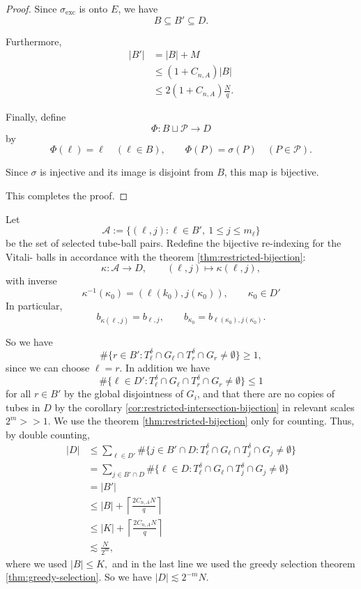 \documentclass[11pt, letterpaper]{nyjm}
\begin{document}
\begin{proof}
		Since $\sigma_{\mathrm{exc}}$ is onto $E$,
		we have
		\[
		B\subseteq B'\subseteq D.
		\]
		
		Furthermore,
		\[
		\begin{aligned}
			|B'|
			&=|B|+M\\
			&\le(1+C_{n,A})|B|\\
			&\le2(1+C_{n,A})\frac Nq.
		\end{aligned}
		\]
		
		Finally, define
		\[
		\Phi:B\sqcup\mathcal P\longrightarrow D
		\]
		by
		\[
		\Phi(\ell)=\ell\quad(\ell\in B),
		\qquad
		\Phi(P)=\sigma(P)\quad(P\in\mathcal P).
		\]
		
		Since $\sigma$ is injective and its
		image is disjoint from $B$, this
		map is bijective.
		
		This completes the proof.
	\end{proof}
	
	Let
	\[
	\mathcal A
	:=
	\{(\ell,j):\ell\in B',\ 1\le j\le m_\ell\}
	\]
	be the set of selected tube-ball pairs.
	Redefine the bijective re-indexing for the Vitali- balls in accordance with the theorem \ref{thm:restricted-bijection}:
	\[
	\kappa:\mathcal A\longrightarrow D,
	\qquad
	(\ell,j)\longmapsto \kappa(\ell,j),
	\]
	with inverse
	\[
	\kappa^{-1}(\kappa_0)
	=
	(\ell(k_0),j(\kappa_0)),
	\qquad \kappa_0 \in D'
	\]
	In particular,
	\[
	b_{\kappa(\ell,j)}=b_{\ell,j},
	\qquad
	b_{\kappa_0}=b_{\ell(\kappa_0),j(\kappa_0)}.
	\]
	
	So we have
	\[
	\#\{r\in B' :T_{\ell}^{\delta} \cap  G_{\ell} \cap T_r^{\delta} \cap G_{r} \neq \emptyset\} \geq 1, 
	\]
	since we can choose $\ell = r.$
	In addition we have 
	\[
	\#\{\ell \in D':T_{\ell}^{\delta} \cap G_{\ell} \cap T_{r}^{\delta} \cap G_{r}\neq \emptyset\} \leq 1
	\] for all $r \in B'$ by the global disjointness of $G_{i}$, and that there are no copies of tubes in $D$ by the corollary  \ref{cor:restricted-intersection-bijection} in relevant scales $2^m >> 1.$  
	We use the theorem \ref{thm:restricted-bijection} only for counting.
	Thus, by double counting,
	\[
	\begin{aligned}
		|D|
		&\leq \sum_{\ell\in D'}
		\#\{j\in B' \cap D :T_{\ell}^{\delta} \cap G_{\ell} \cap T_j^{\delta} \cap G_{j} \neq \emptyset\} \\
		&=
		\sum_{j \in B' \cap D}
		\#\{\ell \in D:T_{\ell}^{\delta} \cap G_{\ell} \cap T_{j}^{\delta} \cap G_j \neq \emptyset\} \\
		&= |B'| \\
		&\leq |B| + \left\lceil \frac{2C_{n,A}N}{q} \right \rceil \\
		&\leq |K| + \left \lceil \frac{2C_{n,A}N}{q} \right\rceil\\
		&\lesssim \frac{N}{2^m},
	\end{aligned}
	\]
	where we used $|B| \leq K,$ and 
	in the last line we used the greedy selection theorem \ref{thm:greedy-selection}. 
	So we have $|D| \lesssim 2^{-m}N.$
	
\end{document}
